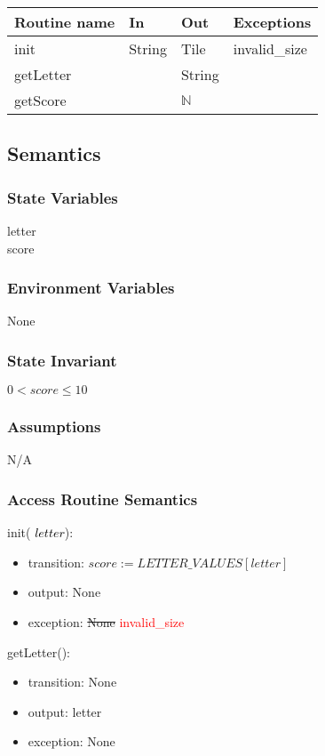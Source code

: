 \documentclass[12pt]{article}
\begin{document}
\begin{tabular}{| l | l | l | l |}
\hline
\textbf{Routine name} & \textbf{In} & \textbf{Out} & \textbf{Exceptions}\\
\hline
init & String & Tile & invalid\_size \\
\hline
getLetter &  & String & \\
\hline
getScore & & $\mathbb{N}$ & \\
\hline
\end{tabular}

\subsection* {Semantics}

\subsubsection* {State Variables}
letter \\
score \\
\subsubsection* {Environment Variables}
None
\subsubsection* {State Invariant}
$0 < score \leq 10$
\subsubsection* {Assumptions}

N/A

\subsubsection* {Access Routine Semantics}

\noindent init(\textcolor{black}{ $letter$}):
\begin{itemize}
\item transition: $score := LETTER\_VALUES[letter]$ 
\item output: None
\item exception: \sout{None} \textcolor{red}{invalid\_size}
\end{itemize}

\noindent getLetter():
\begin{itemize}
\item transition: None
\item output: letter
\item exception: None
\end{itemize}
\end{document}
